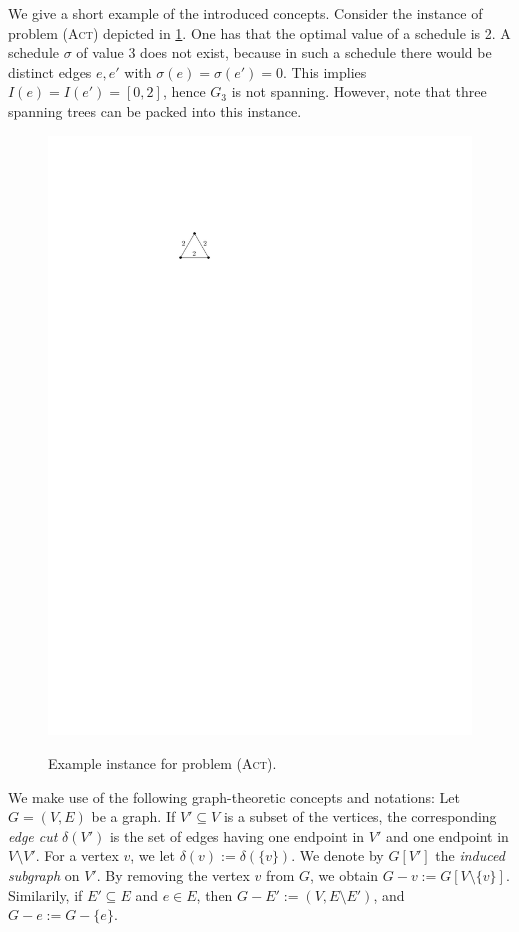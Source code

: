 \documentclass[runningheads]{llncs}
\numberwithin{equation}{section}
\newcommand{\set}[1]{\{ #1 \}}
\newcommand{\act}{\textsc{(Act)}}
\begin{document}
We give a short example of the introduced concepts. Consider the instance of problem {\act} depicted in \cref{fig:introduction_examples}. One has that the optimal value of a schedule is 2. A schedule $\sigma$ of value 3 does not exist, because in such a schedule there would be distinct edges $e, e'$ with $\sigma(e) = \sigma(e') = 0$. This implies $I(e) = I(e') = [0, 2]$, hence $G_3$ is not spanning. However, note that three spanning trees can be packed into this instance.
\begin{figure}
     \centering
         \includegraphics[scale=1]{img/example-act}
         \label{fig:example_act}
        \caption{Example instance for problem {\act}.}
        \label{fig:introduction_examples}
\end{figure}

We make use of the following graph-theoretic concepts and notations: Let $G = (V,E)$ be a graph. If $V' \subseteq V$ is a subset of the vertices, the corresponding \emph{edge cut} $\delta(V')$ is the set of edges having one endpoint in $V'$ and one endpoint in $V \setminus V'$. For a vertex $v$, we let $\delta(v) := \delta(\set{v})$. 
We denote by $G[V']$ the \emph{induced subgraph} on $V'$. By removing the vertex $v$ from $G$, we obtain $G - v := G[V \setminus \set{v}]$. Similarily, if $E' \subseteq E$ and $e \in E$, then $G - E' := (V, E \setminus E')$, and $G - e := G - \set{e}$.
\end{document}
